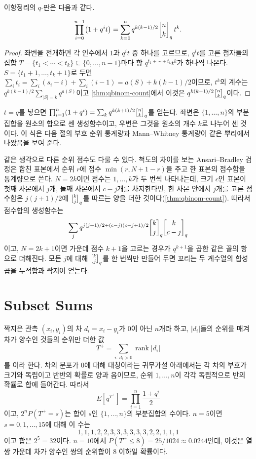 이항정리의 $q$-판은 다음과 같다.

\begin{theorem}[$q$-이항정리]
\label{thm:qbinomial-theorem}
\[
\prod_{i=0}^{n-1}\bigl(1+q^it\bigr)=\sum_{k=0}^nq^{k(k-1)/2}\qbinom nk\,t^k.
\]
\end{theorem}

\begin{proof}
좌변을 전개하면 각 인수에서 $1$과 $q^it$ 중 하나를 고르므로, $q^it$를 고른 첨자들의 집합 $T=\{t_1<\cdots<t_k\}\subseteq\{0,\dots,n-1\}$마다 항 $q^{t_1+\cdots+t_k}t^k$가 하나씩 나온다. $S=\{t_1+1,\dots,t_k+1\}$로 두면 $\sum_it_i=\sum_i(s_i-i)+\sum_i(i-1)=a(S)+k(k-1)/2$이므로, $t^k$의 계수는 $q^{k(k-1)/2}\sum_{|S|=k}q^{a(S)}$이고 \cref{thm:qbinom-count}에서 이것은 $q^{k(k-1)/2}\qbinom nk$이다.
\end{proof}

$t=q$를 넣으면 $\prod_{i=1}^n(1+q^i)=\sum_kq^{k(k+1)/2}\qbinom nk$를 얻는다. 좌변은 $\{1,\dots,n\}$의 부분집합을 원소의 합으로 센 생성함수이고, 우변은 그것을 원소의 개수 $k$로 나누어 센 것이다. 이 식은 다음 절의 부호 순위 통계량과 Mann--Whitney 통계량이 같은 뿌리에서 나왔음을 보여 준다.

같은 생각으로 다른 순위 점수도 다룰 수 있다. 척도의 차이를 보는 Ansari--Bradley 검정\cite{ansari1960}은 합친 표본에서 순위 $r$에 점수 $\min(r,N+1-r)$을 주고 한 표본의 점수합을 통계량으로 쓴다. $N=2k$이면 점수는 $1,\dots,k$가 두 번씩 나타나는데, 크기 $c$인 표본이 첫째 사본에서 $j$개, 둘째 사본에서 $c-j$개를 차지한다면, 한 사본 안에서 $j$개를 고른 점수합은 $j(j+1)/2$에 $\qbinom kj$를 따르는 양을 더한 것이다(\cref{thm:qbinom-count}). 따라서 점수합의 생성함수는
\[
\sum_jq^{j(j+1)/2+(c-j)(c-j+1)/2}\qbinom kj\qbinom k{c-j}
\]
이고, $N=2k+1$이면 가운데 점수 $k+1$을 고르는 경우가 $q^{k+1}$을 곱한 같은 꼴의 항으로 더해진다. 모든 $j$에 대해 $\qbinom kj$를 한 번씩만 만들어 두면 꼬리는 두 계수열의 합성곱을 누적합과 짝지어 얻는다.

\section{Subset Sums}
\label{sec:signed-rank}

짝지은 관측 $(x_i,y_i)$의 차 $d_i=x_i-y_i$가 $0$이 아닌 $n$개라 하고, $|d_i|$들의 순위를 매겨 차가 양수인 것들의 순위만 더한 값
\[
T^+=\sum_{i:\,d_i>0}\operatorname{rank}|d_i|
\]
를 이라 한다\cite{wilcoxon1945}. 차의 분포가 $0$에 대해 대칭이라는 귀무가설 아래에서는 각 차의 부호가 크기와 독립이고 반반의 확률로 양과 음이므로, 순위 $1,\dots,n$이 각각 독립적으로 반의 확률로 합에 들어간다. 따라서
\begin{equation}
\label{eq:signed-rank-gf}
E[q^{T^+}]=\prod_{i=1}^n\frac{1+q^i}2
\end{equation}
이고, $2^nP(T^+=s)$는 합이 $s$인 $\{1,\dots,n\}$의 부분집합의 수이다. $n=5$이면 $s=0,1,\dots,15$에 대해 이 수는
\[
1,1,1,2,2,3,3,3,3,3,3,2,2,1,1,1
\]
이고 합은 $2^5=32$이다. $n=10$에서 $P(T^+\le8)=25/1024\approx0.0244$인데, 이것은 열 쌍 가운데 차가 양수인 쌍의 순위합이 $8$ 이하일 확률이다.

